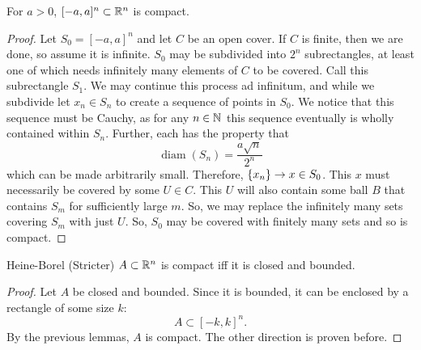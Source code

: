\documentclass[11pt]{article}
\begin{document}
\begin{lemma}{}{}
  For $a > 0$, $[-a, a]^{n} \subset \RR[n]$ is compact.
\end{lemma}
\begin{proof}
  Let $S_{0} = [-a, a]^{n}$ and let $C$ be an open cover. If $C$ is finite, then we are done, so assume it is infinite.
  $S_{0}$ may be subdivided into $2^{n}$ subrectangles, at least one of which needs infinitely many elements of $C$ to be covered.
  Call this subrectangle $S_{1}$. We may continue this process ad infinitum, and while we subdivide let $x_{n} \in S_{n}$ to create a sequence of points in $S_{0}$.
  We notice that this sequence must be Cauchy, as for any $n \in \NN$ this sequence eventually is wholly contained within $S_{n}$.
  Further, each has the property that
  \[ \operatorname{diam}(S_{n}) = \frac{a\sqrt{n}}{2^{n}} \]
  which can be made arbitrarily small. Therefore, $\set{x_{n}} \to x \in S_{0}$.
  This $x$ must necessarily be covered by some $U \in C$. This $U$ will also contain some ball $B$ that contains $S_{m}$ for sufficiently large $m$.
  So, we may replace the infinitely many sets covering $S_{m}$ with just $U$. So, $S_{0}$ may be covered with finitely many sets and so is compact.
\end{proof}


\begin{theorem}{Heine-Borel (Stricter)}{}
  $A \subset \RR[n]$ is compact iff it is closed and bounded.
\end{theorem}
\begin{proof}
  Let $A$ be closed and bounded. Since it is bounded, it can be enclosed by a rectangle of some size $k$:
  \[ A \subset [-k, k]^{n}. \]
  By the previous lemmas, $A$ is compact. The other direction is proven before.
\end{proof}
\end{document}
